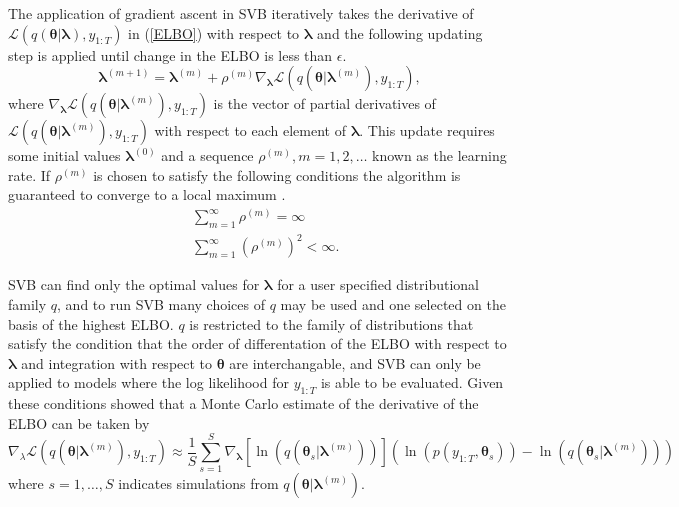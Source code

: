 \documentclass[12pt,a4paper]{article}%
\numberwithin{equation}{section}
\begin{document}
The application of gradient ascent in SVB iteratively takes the derivative of $\mathcal{L}(q(\boldsymbol{\theta} | \boldsymbol{\lambda}), y_{1:T})$ in (\ref{ELBO}) with respect to $\boldsymbol{\lambda}$ and the following updating step is applied until change in the ELBO is less than $\epsilon$.
\begin{equation}
\label{SVB1}
\boldsymbol{\lambda}^{(m+1)} = \boldsymbol{\lambda}^{(m)} + \rho^{(m)} \nabla_{\boldsymbol{\lambda}} \mathcal{L}(q(\boldsymbol{\theta} | \boldsymbol{\lambda}^{(m)}), y_{1:T}),
\end{equation}
where $\nabla_{\boldsymbol{\lambda}}\mathcal{L}(q(\boldsymbol{\theta} | \boldsymbol{\lambda}^{(m)}), y_{1:T})$ is the vector of partial derivatives of $\mathcal{L}(q(\boldsymbol{\theta} | \boldsymbol{\lambda}^{(m)}), y_{1:T})$ with respect to each element of $\boldsymbol{\lambda}$. This update requires some initial values $\boldsymbol{\lambda}^{(0)}$ and a sequence $\rho^{(m)}, m = 1, 2, \dots$ known as the learning rate. If $\rho^{(m)}$ is chosen to satisfy the following conditions the algorithm is guaranteed to converge to a local maximum \citep{Robbins1951}.
\begin{align}
&\sum_{m=1}^{\infty} \rho^{(m)} =  \infty \\
&\sum_{m=1}^{\infty} (\rho^{(m)})^2 <  \infty.
\end{align}

SVB can find only the optimal values for $\boldsymbol{\lambda}$ for a user specified distributional family $q$, and to run SVB many choices of $q$ may be used and one selected on the basis of the highest ELBO. $q$ is restricted to the family of distributions that satisfy the condition that the order of differentation of the ELBO with respect to $\boldsymbol{\lambda}$ and integration with respect to $\boldsymbol{\theta}$ are interchangable, and SVB can only be applied to models where the log likelihood for $y_{1:T}$ is able to be evaluated. Given these conditions \citet{Ranganath2014} showed that a Monte Carlo estimate of the derivative of the ELBO can be taken by
\begin{equation}
\label{SVB2}
\nabla_{\lambda}\mathcal{L}(q(\boldsymbol{\theta} | \boldsymbol{\lambda}^{(m)}), y_{1:T}) \approx \frac{1}{S}\sum_{s=1}^{S} \nabla_{\boldsymbol{\lambda}} [\ln(q(\boldsymbol{\theta}_s | \boldsymbol{\lambda}^{(m)}))] (\ln (p(y_{1:T}, \boldsymbol{\theta}_s)) - \ln(q(\boldsymbol{\theta}_s | \boldsymbol{\lambda}^{(m)})))
\end{equation}
where $s = 1, \dots, S$ indicates simulations from $q(\boldsymbol{\theta} | \boldsymbol{\lambda}^{(m)})$.
\end{document}
